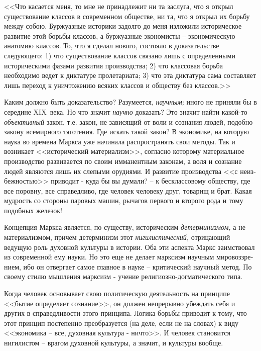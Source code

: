 \documentclass{book}
\begin{document}
<<Что касается меня, то мне не принадлежит ни та заслуга, что я открыл существование классов в современном обществе, ни та, что я 
открыл их борьбу между собою. Буржуазные историки задолго до меня изложили историческое развитие этой борьбы классов, а 
буржуазные экономисты -- экономическую анатомию классов. То, что я сделал нового, состояло в доказательстве следующего: 1) что 
существование классов связано лишь с определенными историческими фазами развития производства; 2) что классовая борьба 
необходимо ведет к диктатуре пролета­риата; 3) что эта диктатура сама составляет лишь переход к уничтожению всяких классов и 
обществу без классов.>>

Каким должно быть доказательство? Разумеется, \textit{научным;} иного не приняли бы в середине XIX~века. Но что значит 
\textit{научно} доказать?  Это значит найти какой-то \textit{объективный}  закон, т.е. закон, не зависящий от воли и сознания 
людей, подобно закону всемирного тяготения. Где искать такой закон? В экономике, на которую наука во времена Маркса уже начинала 
распространять свои методы. Так и возникает <<исторический материализм>>, со­гласно которому материальное производство развивается 
по своим имманентным законам, а воля и сознание людей являются лишь их слепыми орудиями. И развитие производства <<с неиз­
бежностью>> приводит - куда бы вы думали? -- к бесклассовому обществу, где все поровну, все справедливо, где человек челове­ку 
друг, товарищ и брат. Какая мудрость со стороны паровых машин, рычагов первого и второго рода и тому подобных желе­зок!

Концепция Маркса является, по существу, историческим \textit{детерминизмом,}  а не материализмом, причем детерминизм этот 
\textit{нигилистический,}  отрицающий ведущую роль духовной культуры в истории. Оба эти аспекта Маркс заимствовал из современной 
ему науки. Но это еще не делает марксизм научным мировоззре­нием, ибо он отвергает самое главное в науке -- критический научный 
метод. По своему стилю мышления марксизм - учение религиозно-догматического типа.

Когда человек основывает свою политическую деятельность на принципе <<бытие определяет сознание>>, он должен непрерывно убеждать 
себя и других в справедливости этого принципа. Логика борьбы приводит к тому, что этот принцип постепенно преобразуется (на 
деле, если не на словах) к виду <<экономика -- все, духовная культура - ничто>>. И человек становится нигилистом -- врагом 
духовной культуры, а значит, и культуры вообще.
\end{document}
